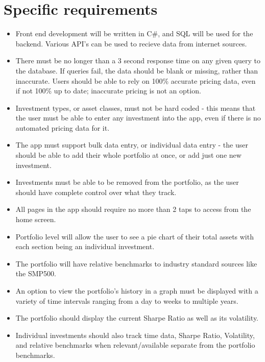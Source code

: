 \documentclass[onecolumn, draftclsnofoot,10pt, compsoc]{IEEEtran}
\begin{document}
\section{Specific requirements}

\begin{itemize}
	\item Front end development will be written in C\#, and SQL will be used for the backend. Various API's can be used to recieve data from internet sources. 
	\item There must be no longer than a 3 second response time on any given query to the database. If queries fail, the data should be blank or missing, 
		rather than inaccurate. Users should be able to rely on 100\% accurate pricing data, even if not 100\% up to date; inaccurate pricing is not an option. 
	\item Investment types, or asset classes, must not be hard coded - this means that the user must be able to enter any investment into the app, 
		even if there is no automated pricing data for it. 
	\item The app must support bulk data entry, or individual data entry - the user should be able to 
		add their whole portfolio at once, or add just one new investment. 
	\item Investments must be able to be removed from the portfolio, as the user should 
		have complete control over what they track. 
	\item All pages in the app should require no more than 2 taps to access from the home screen.
	\item Portfolio level will allow the user to see a pie chart of their total assets with each section being an individual investment.
	\item The portfolio will have relative benchmarks to industry standard sources like the SMP500.
	\item An option to view the portfolio's history in a graph must be displayed with a variety of time intervals ranging from a day to weeks to multiple years.
	\item The portfolio should display the current Sharpe Ratio as well as its volatility.
	\item Individual investments should also track time data, Sharpe Ratio, Volatility, and relative benchmarks when relevant/available separate from the portfolio benchmarks.
\end{itemize}
\end{document}
